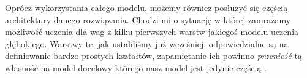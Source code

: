 Oprócz wykorzystania całego modelu, możemy również posłużyć się częścią architektury danego rozwiązania. Chodzi mi o sytuację w której zamrażamy możliwość uczenia dla wag z kilku pierwszych warstw jakiegoś modelu uczenia głębokiego. Warstwy te, jak ustaliliśmy już wcześniej, odpowiedzialne są na definiowanie bardzo prostych kształtów, zapamiętanie ich powinno \textit{przenieść} tą własność na model docelowy którego nasz model jest jedynie częścią \cite{python_ml}.
























